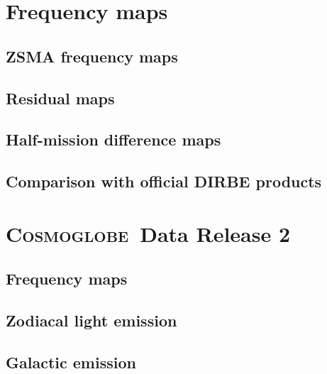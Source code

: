 \documentclass{aa}
\def\Cosmoglobe{\textsc{Cosmoglobe}}
\begin{document}
\section{Frequency maps}
\label{sec:maps}

\subsection{ZSMA frequency maps}

\subsection{Residual maps}

\subsection{Half-mission difference maps}

\subsection{Comparison with official DIRBE products}



\clearpage
\section{\Cosmoglobe\ Data Release 2}
\label{sec:astrophysics}

\subsection{Frequency maps}

\subsection{Zodiacal light emission}

\clearpage
\subsection{Galactic emission}
\end{document}
